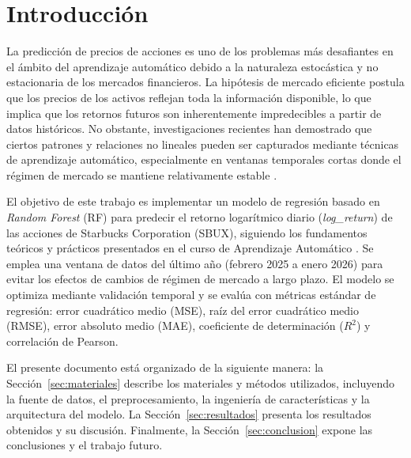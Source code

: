 \documentclass[12pt,a4paper]{article}
\begin{document}
\tableofcontents
\clearpage

\section{Introducción}

La predicción de precios de acciones es uno de los problemas más desafiantes en el ámbito del aprendizaje automático debido a la naturaleza estocástica y no estacionaria de los mercados financieros. La hipótesis de mercado eficiente \cite{fama1970efficient} postula que los precios de los activos reflejan toda la información disponible, lo que implica que los retornos futuros son inherentemente impredecibles a partir de datos históricos. No obstante, investigaciones recientes han demostrado que ciertos patrones y relaciones no lineales pueden ser capturados mediante técnicas de aprendizaje automático, especialmente en ventanas temporales cortas donde el régimen de mercado se mantiene relativamente estable \cite{gu2020empirical}.

El objetivo de este trabajo es implementar un modelo de regresión basado en \textit{Random Forest} (RF) \cite{breiman2001random} para predecir el retorno logarítmico diario (\textit{log\_return}) de las acciones de Starbucks Corporation (SBUX), siguiendo los fundamentos teóricos y prácticos presentados en el curso de Aprendizaje Automático \cite{aceves2026ia}. Se emplea una ventana de datos del último año (febrero 2025 a enero 2026) para evitar los efectos de cambios de régimen de mercado a largo plazo. El modelo se optimiza mediante validación temporal y se evalúa con métricas estándar de regresión: error cuadrático medio (MSE), raíz del error cuadrático medio (RMSE), error absoluto medio (MAE), coeficiente de determinación ($R^{2}$) y correlación de Pearson.

El presente documento está organizado de la siguiente manera: la Sección~\ref{sec:materiales} describe los materiales y métodos utilizados, incluyendo la fuente de datos, el preprocesamiento, la ingeniería de características y la arquitectura del modelo. La Sección~\ref{sec:resultados} presenta los resultados obtenidos y su discusión. Finalmente, la Sección~\ref{sec:conclusion} expone las conclusiones y el trabajo futuro.
\end{document}
